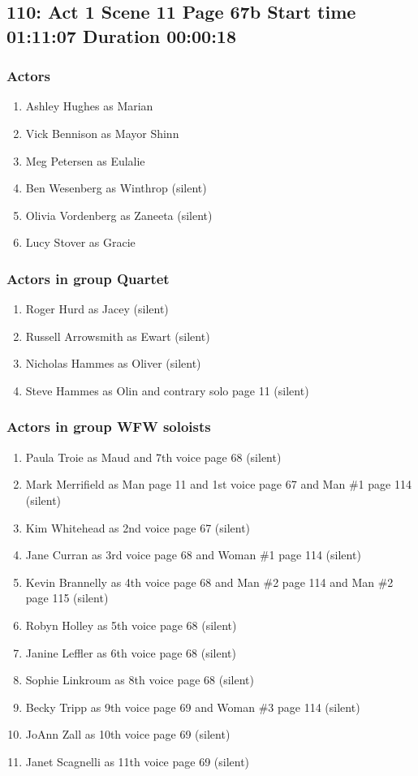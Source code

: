 \subsection{110: Act 1 Scene 11 Page 67b Start time 01:11:07 Duration 00:00:18}

\subsubsection{Actors}
\begin{enumerate}
\item Ashley Hughes as Marian
\item Vick Bennison as Mayor Shinn
\item Meg Petersen as Eulalie
\item Ben Wesenberg as Winthrop (silent)
\item Olivia Vordenberg as Zaneeta (silent)
\item Lucy Stover as Gracie
\end{enumerate}
\subsubsection{Actors in group Quartet}
\begin{enumerate}
\item Roger Hurd as Jacey (silent)
\item Russell Arrowsmith as Ewart (silent)
\item Nicholas Hammes as Oliver (silent)
\item Steve Hammes as Olin and contrary solo page 11 (silent)
\end{enumerate}
\subsubsection{Actors in group WFW soloists}
\begin{enumerate}
\item Paula Troie as Maud and 7th voice page 68 (silent)
\item Mark Merrifield as Man page 11 and 1st voice page 67 and Man \#1 page 114 (silent)
\item Kim Whitehead as 2nd voice page 67 (silent)
\item Jane Curran as 3rd voice page 68 and Woman \#1 page 114 (silent)
\item Kevin Brannelly as 4th voice page 68 and Man \#2 page 114 and Man \#2 page 115 (silent)
\item Robyn Holley as 5th voice page 68 (silent)
\item Janine Leffler as 6th voice page 68 (silent)
\item Sophie Linkroum as 8th voice page 68 (silent)
\item Becky Tripp as 9th voice page 69 and Woman \#3 page 114 (silent)
\item JoAnn Zall as 10th voice page 69 (silent)
\item Janet Scagnelli as 11th voice page 69 (silent)
\end{enumerate}

